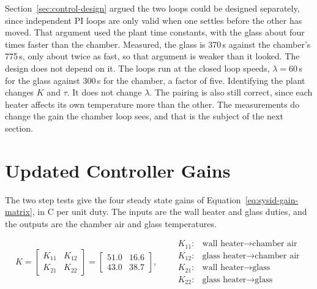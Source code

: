 Section~\ref{sec:control-design} argued the two loops could be designed separately, since independent PI loops are only valid when one settles before the other has moved. That argument used the plant time constants, with the glass about four times faster than the chamber. Measured, the glass is 370\,s against the chamber's 775\,s, only about twice as fast, so that argument is weaker than it looked. The design does not depend on it. The loops run at the closed loop speeds, $\lambda = 60$\,s for the glass against 300\,s for the chamber, a factor of five. Identifying the plant changes $K$ and $\tau$. It does not change $\lambda$. The pairing is also still correct, since each heater affects its own temperature more than the other. The measurements do change the gain the chamber loop sees, and that is the subject of the next section.

\section{Updated Controller Gains}
\label{sec:sysid-gains}

The two step tests give the four steady state gains of Equation~\ref{eq:sysid-gain-matrix}, in \textdegree{}C per unit duty. The inputs are the wall heater and glass duties, and the outputs are the chamber air and glass temperatures.

\begin{equation}
    K =
    \begin{bmatrix}
        K_{11} & K_{12} \\
        K_{21} & K_{22}
    \end{bmatrix}
    =
    \begin{bmatrix}
        51.0 & 16.6 \\
        43.0 & 38.7
    \end{bmatrix},
    \qquad
    \begin{array}{ll}
        K_{11}: & \text{wall heater} \rightarrow \text{chamber air} \\
        K_{12}: & \text{glass heater} \rightarrow \text{chamber air} \\
        K_{21}: & \text{wall heater} \rightarrow \text{glass} \\
        K_{22}: & \text{glass heater} \rightarrow \text{glass}
    \end{array}
    \label{eq:sysid-gain-matrix}
\end{equation}


